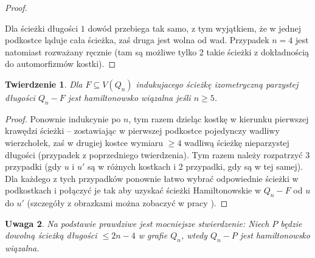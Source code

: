 \documentclass{pracamgr}
\newtheorem{theorem}{Twierdzenie}[chapter]
\newtheorem{remark}[theorem]{Uwaga}
\begin{document}
\begin{proof}
\begin{center}
     \end{center}
     Dla ścieżki długości $1$ dowód przebiega tak samo, z tym wyjątkiem, że w jednej podkostce ląduje cała ścieżka, zaś druga jest wolna od wad.
     Przypadek $n=4$ jest natomiast rozważany ręcznie
     (tam są możliwe tylko 2 takie ścieżki z dokładnością do automorfizmów kostki).
    \end{proof}
    \begin{theorem}\label{hamilton - sciezka, parz}
     Dla $F\subseteq V(Q_n)$ indukujacego ścieżkę izometryczną parzystej długości $Q_n-F$ jest hamiltonowsko wiązalna jeśli $n\ge5$.
    \end{theorem}
    \begin{proof}
     Ponownie indukcynie po $n$, tym razem dzieląc kostkę w kierunku pierwszej krawędzi ścieżki -- zostawiając w pierwszej podkostce pojedynczy wadliwy wierzchołek,
     zaś w drugiej kostce wymiaru $\ge4$ wadliwą ścieżkę nieparzystej długości (przypadek z poprzedniego twierdzenia).
     Tym razem należy rozpatrzyć 3 przypadki (gdy $u$ i $u'$ są w różnych kostkach i 2 przypadki, gdy są w tej samej).
     Dla każdego z tych przypadków ponownie łatwo wybrać odpowiednie ścieżki w podkostkach i połączyć je tak aby uzyskać ścieżki Hamiltonowskie w
     $Q_n-F$ od $u$ do $u'$ (szczegóły z obrazkami można zobaczyć w pracy \cite{Pegr}).
    \end{proof}
    \begin{remark}
     Na podstawie \cite{SCJY} prawdziwe jest mocniejsze stwierdzenie:\newline
     Niech $P$ będzie dowolną ścieżką długości $\le 2n-4$ w grafie $Q_n$, wtedy $Q_n-P$ jest hamiltonowsko wiązalna.
    \end{remark}
\end{document}
